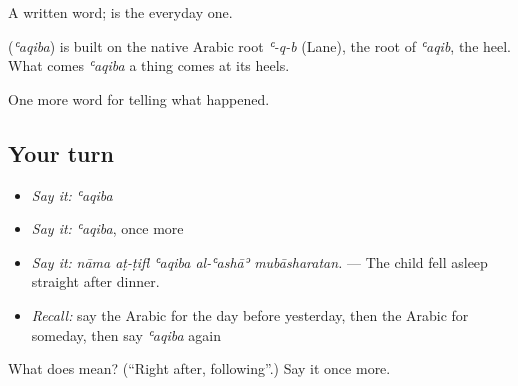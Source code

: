 A written word;  is the everyday one.

\begin{cousinweb}
\textbf{} (\emph{ʿaqiba}) is built on the native Arabic root \emph{ʿ-q-b} (Lane), the root of \emph{ʿaqib}, the heel. What comes \emph{ʿaqiba} a thing comes at its heels.
\end{cousinweb}

\begin{grammarlens}[title={What you've built}]
One more word for telling what happened.
\end{grammarlens}

\subsection*{Your turn}
\begin{itemize}
\raggedright
  \item \emph{Say it:} \emph{ʿaqiba}
  \item \emph{Say it:} \emph{ʿaqiba}, once more
  \item \emph{Say it:} \emph{nāma aṭ-ṭifl ʿaqiba al-ʿashāʾ mubāsharatan.} — The child fell asleep straight after dinner.
  \item \emph{Recall:} say the Arabic for the day before yesterday, then the Arabic for someday, then say \emph{ʿaqiba} again
\end{itemize}

\begin{tcolorbox}[breakable,colback=teal!4,colframe=teal!35!black,title={Before you move on}]
What does  mean? (\textquotedblleft{}Right after, following\textquotedblright{}.) Say it once more.
\end{tcolorbox}
